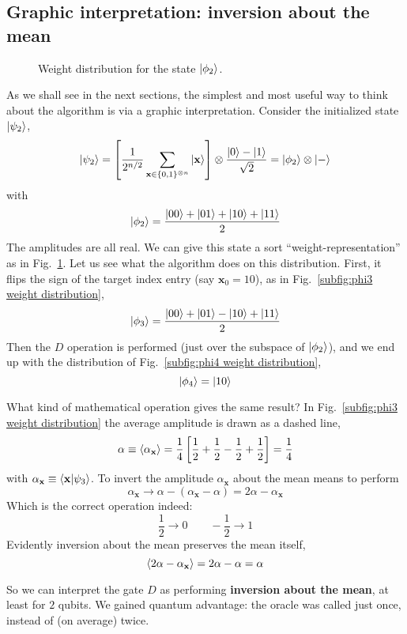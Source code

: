 \subsection{Graphic interpretation: inversion about the mean}

\begin{figure}
	\centering
	
	\caption{Weight distribution for the state $\ket{\phi_2}$.}
	\label{fig:phi2 weight distribution}
\end{figure}

As we shall see in the next sections, the simplest and most useful way to think about the algorithm is via a graphic interpretation. Consider the initialized state $\ket{\psi_2}$,
\[
	\ket{\psi_2} = \left[{\frac{1}{2^{n/2}} \sum_{\mathbf{x} \in \lbrace 0,1 \rbrace^{\otimes n}} \ket{\mathbf{x}}}\right] \otimes \frac{\ket{0} - \ket{1}}{\sqrt{2}} = \ket{\phi_2} \otimes \ket{-}
\]
with
\[
	\ket{\phi_2} = \frac{\ket{00}+\ket{01}+\ket{10}+\ket{11}}{2}
\]
The amplitudes are all real. We can give this state a sort ``weight-representation'' as in Fig.~\ref{fig:phi2 weight distribution}. Let us see what the algorithm does on this distribution. First, it flips the sign of the target index entry (say $\mathbf{x}_0 = 10$), as in Fig.~\ref{subfig:phi3 weight distribution},
\[
	\ket{\phi_3} = \frac{\ket{00}+\ket{01}-\ket{10}+\ket{11}}{2}
\]
Then the $D$ operation is performed (just over the subspace of $\ket{\phi_2}$), and we end up with the distribution of Fig.~\ref{subfig:phi4 weight distribution},
\[
	\ket{\phi_4} = \ket{10}	
\]

What kind of mathematical operation gives the same result?  In Fig.~\ref{subfig:phi3 weight distribution} the average amplitude is drawn as a dashed line,
\[
	\alpha \equiv \ev{\alpha_\mathbf{x}} = \frac{1}{4} \lrS{\frac{1}{2} + \frac{1}{2} - \frac{1}{2} + \frac{1}{2}} = \frac{1}{4}
\]
with $\alpha_\mathbf{x} \equiv \braket{\mathbf{x}}{\psi_3}$. To invert the amplitude $\alpha_\mathbf{x}$ about the mean means to perform
\[
	\alpha_\mathbf{x} \to \alpha - (\alpha_\mathbf{x} - \alpha) = 2 \alpha - \alpha_\mathbf{x} 
\]
Which is the correct operation indeed:
\[
	\frac{1}{2} \to 0
	\qquad
	- \frac{1}{2} \to 1
\]
Evidently inversion about the mean preserves the mean itself,
\[
	\ev{2 \alpha - \alpha_\mathbf{x}} = 2 \alpha - \alpha = \alpha
\]

So we can interpret the gate $D$ as performing \textbf{inversion about the mean}, at least for $2$ qubits. We gained quantum advantage: the oracle was called just once, instead of (on average) twice.


